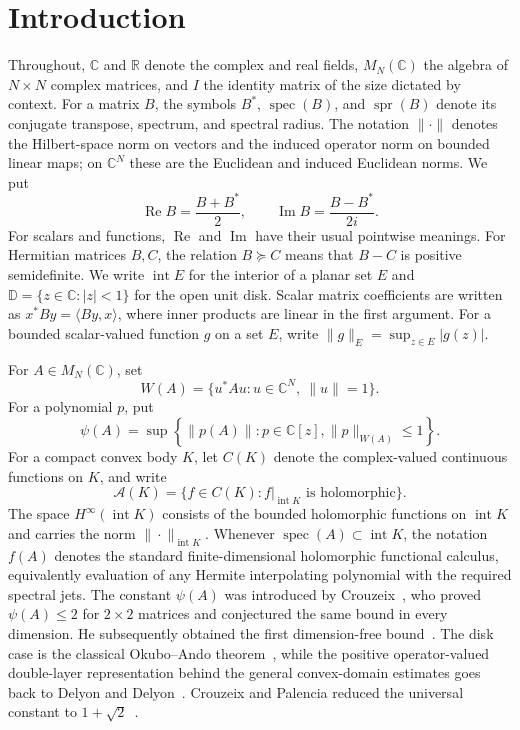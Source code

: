 \documentclass[preprints,article,submit,oneauthor]{Definitions/mdpi}
\numberwithin{equation}{section}
\newcommand{\C}{\mathbb C}
\newcommand{\R}{\mathbb R}
\newcommand{\D}{\mathbb D}
\newcommand{\spec}{\operatorname{spec}}
\newcommand{\spr}{\operatorname{spr}}
\newcommand{\Rea}{\operatorname{Re}}
\newcommand{\Ima}{\operatorname{Im}}
\newcommand{\Int}{\operatorname{int}}
\begin{document}
\section{Introduction}

Throughout, \(\C\) and \(\R\) denote the complex and real fields,
\(M_N(\C)\) the algebra of
\(N\times N\) complex matrices, and \(I\) the identity matrix of the size
dictated by context.  For a matrix \(B\), the symbols \(B^*\), \(\spec(B)\),
and \(\spr(B)\) denote its conjugate transpose, spectrum, and spectral radius.
The notation \(\|\cdot\|\) denotes the Hilbert-space norm on vectors and the
induced operator norm on bounded linear maps; on \(\C^N\) these are the
Euclidean and induced Euclidean norms.  We put
\[
 \Rea B=\frac{B+B^*}{2},\qquad \Ima B=\frac{B-B^*}{2i}.
\]
For scalars and functions, \(\Rea\) and \(\Ima\) have their usual pointwise
meanings.  For Hermitian matrices
\(B,C\), the relation \(B\succeq C\) means that \(B-C\) is positive
semidefinite.  We write \(\Int E\) for the interior of a planar set \(E\) and
\(\D=\{z\in\C:|z|<1\}\) for the open unit disk.  Scalar matrix coefficients
are written as \(x^*By=\langle By,x\rangle\), where inner products are linear
in the first argument.  For a bounded scalar-valued function \(g\) on a set
\(E\), write \(\|g\|_E=\sup_{z\in E}|g(z)|\).

For \(A\in M_N(\C)\), set
\[
 W(A)=\{u^*Au:u\in\C^N,\ \|u\|=1\}.
\]
For a polynomial \(p\), put
\[
 \psi(A)=
 \sup\left\{\|p(A)\|:p\in\C[z],
               \|p\|_{W(A)}\leq1\right\}.
\]
For a compact convex body \(K\), let \(C(K)\) denote the complex-valued
continuous functions on \(K\), and write
\[
 \mathcal A(K)=\{f\in C(K):f|_{\Int K}\text{ is holomorphic}\}.
\]
The space \(H^\infty(\Int K)\) consists of the bounded holomorphic functions
on \(\Int K\) and carries the norm \(\|\cdot\|_{\Int K}\).  Whenever
\(\spec(A)\subset\Int K\), the notation \(f(A)\) denotes the standard
finite-dimensional holomorphic functional calculus, equivalently evaluation
of any Hermite interpolating polynomial with the required spectral jets.
The constant \(\psi(A)\) was introduced by Crouzeix~\cite{Crouzeix2004}, who
proved \(\psi(A)\leq2\) for \(2\times2\) matrices and conjectured the same
bound in every dimension.  He subsequently obtained the first
dimension-free bound~\cite{Crouzeix2007}.  The disk case is the classical
Okubo--Ando theorem~\cite{OkuboAndo1975}, while the positive operator-valued
double-layer representation behind the general convex-domain estimates goes
back to Delyon and Delyon~\cite{DelyonDelyon1999}.  Crouzeix and Palencia
reduced the universal constant to \(1+\sqrt2\)~\cite{CrouzeixPalencia2017}.
\end{document}
